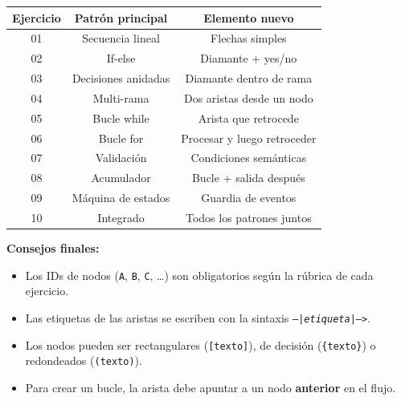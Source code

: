 \documentclass[10pt,a4paper]{article}
\begin{document}
\begin{center}
\begin{tabular}{|c|c|c|}
\hline
\textbf{Ejercicio} & \textbf{Patrón principal} & \textbf{Elemento nuevo} \\
\hline
01 & Secuencia lineal & Flechas simples \\
02 & If-else & Diamante + yes/no \\
03 & Decisiones anidadas & Diamante dentro de rama \\
04 & Multi-rama & Dos aristas desde un nodo \\
05 & Bucle while & Arista que retrocede \\
06 & Bucle for & Procesar y luego retroceder \\
07 & Validación & Condiciones semánticas \\
08 & Acumulador & Bucle + salida después \\
09 & Máquina de estados & Guardia de eventos \\
10 & Integrado & Todos los patrones juntos \\
\hline
\end{tabular}
\end{center}

\vspace{10pt}

\textbf{Consejos finales:}

\begin{itemize}
  \item Los IDs de nodos (\texttt{A}, \texttt{B}, \texttt{C}, \dots)
        son obligatorios según la rúbrica de cada ejercicio.
  \item Las etiquetas de las aristas se escriben con la sintaxis
        \texttt{--|\emph{etiqueta}|-->}.
  \item Los nodos pueden ser rectangulares (\texttt{[texto]}),
        de decisión (\texttt{\{texto\}}) o redondeados (\texttt{(texto)}).
  \item Para crear un bucle, la arista debe apuntar a un nodo
        \textbf{anterior} en el flujo.
\end{itemize}
\end{document}
